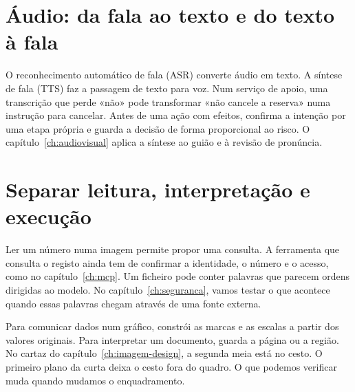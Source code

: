 \section{Áudio: da fala ao texto e do texto à fala}

O reconhecimento automático de fala (ASR) converte áudio em texto. A síntese de fala (TTS) faz a passagem de texto para voz. Num serviço de apoio, uma transcrição que perde «não» pode transformar «não cancele a reserva» numa instrução para cancelar. Antes de uma ação com efeitos, confirma a intenção por uma etapa própria e guarda a decisão de forma proporcional ao risco. O capítulo~\ref{ch:audiovisual} aplica a síntese ao guião e à revisão de pronúncia.

\section{Separar leitura, interpretação e execução}

Ler um número numa imagem permite propor uma consulta. A ferramenta que consulta o registo ainda tem de confirmar a identidade, o número e o acesso, como no capítulo~\ref{ch:mcp}. Um ficheiro pode conter palavras que parecem ordens dirigidas ao modelo. No capítulo~\ref{ch:seguranca}, vamos testar o que acontece quando essas palavras chegam através de uma fonte externa.

Para comunicar dados num gráfico, constrói as marcas e as escalas a partir dos valores originais. Para interpretar um documento, guarda a página ou a região. No cartaz do capítulo~\ref{ch:imagem-design}, a segunda meia está no cesto. O primeiro plano da curta deixa o cesto fora do quadro. O que podemos verificar muda quando mudamos o enquadramento.
